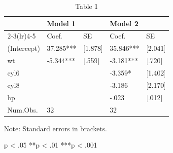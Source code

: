 \begin{table}[!t]
\centering
\caption{Table 1}
\begin{threeparttable}
\begin{tabular}{lllll}
\toprule
& Model 1 &  & Model 2 &  \\ \cmidrule(lr){2-3}\cmidrule(lr){4-5}
& Coef. & SE & Coef. & SE \\ \midrule
(Intercept) & 37.285*** & [1.878] & 35.846*** & [2.041] \\
wt & -5.344*** & [.559] & -3.181*** & [.720] \\
cyl6 &  &  & -3.359* & [1.402] \\
cyl8 &  &  & -3.186 & [2.170] \\
hp &  &  & -.023 & [.012] \\
Num.Obs. & 32 &  & 32 &  \\
\bottomrule
\end{tabular}
\begin{tablenotes}[flushleft]\footnotesize
\item Note: Standard errors in brackets.
\item *p < .05  **p < .01  ***p < .001
\end{tablenotes}
\end{threeparttable}
\end{table}

